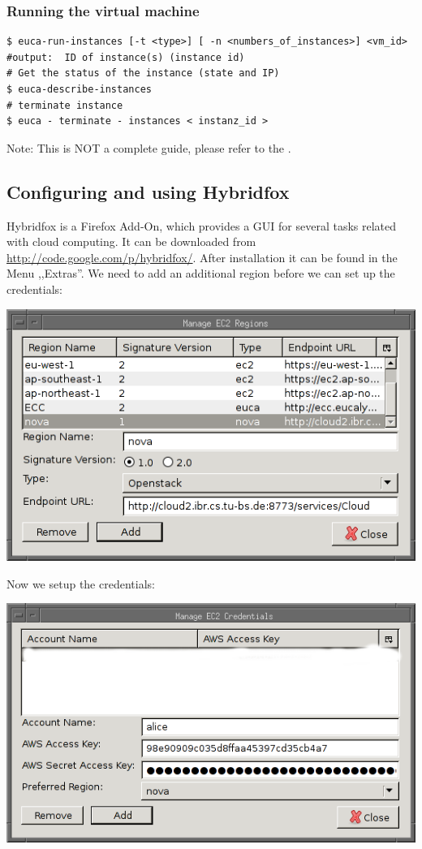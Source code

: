 \documentclass[a4paper,bibtotoc,english,liststotoc]{scrartcl}
\begin{document}
\subsubsection{Running the virtual machine}
\label{sec:runn-virt-mach}
\begin{verbatim}
$ euca-run-instances [-t <type>] [ -n <numbers_of_instances>] <vm_id>
#output:  ID of instance(s) (instance id)
# Get the status of the instance (state and IP)
$ euca-describe-instances  
# terminate instance
$ euca - terminate - instances < instanz_id >
\end{verbatim}
Note: This is NOT a complete guide, please refer to the \cite{eucatools}.%
\subsection{Configuring and using Hybridfox}
\label{sec:conf-hybr}
Hybridfox is a Firefox Add-On, which provides a GUI for several tasks
related with cloud computing. It can be downloaded from
\url{http://code.google.com/p/hybridfox/}. 
After installation it can be found in the Menu ,,Extras''.
We need to add an
additional region before we can set up the credentials:%
\begin{center}
\includegraphics{hybridfox_regions}
\end{center}
Now we setup the credentials:
\begin{center}
  \includegraphics{hybrid_creds}
\end{center}
\end{document}
